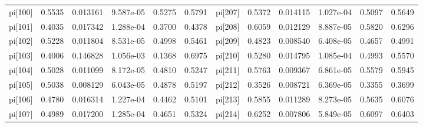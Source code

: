 \documentclass[12pt]{article}
\begin{document}
\begin{table}[h!]
\begin{tabular}{|llllll|llllll|}
pi[100] & 0.5535 & 0.013161  & 9.587e-05 & 0.5275 &0.5791 &pi[207] & 0.5372 & 0.014115  & 1.027e-04 & 0.5097 &0.5649 \\
pi[101] & 0.4035 & 0.017342  & 1.288e-04 & 0.3700 &0.4378 &pi[208] & 0.6059 & 0.012129  & 8.887e-05 & 0.5820 &0.6296 \\
pi[102] & 0.5228 & 0.011804  & 8.531e-05 & 0.4998 &0.5461 &pi[209] & 0.4823 & 0.008540  & 6.408e-05 & 0.4657 &0.4991 \\
pi[103] & 0.4006 & 0.146828  & 1.056e-03 & 0.1368 &0.6975 &pi[210] & 0.5280 & 0.014795  & 1.085e-04 & 0.4993 &0.5570 \\
pi[104] & 0.5028 & 0.011099  & 8.172e-05 & 0.4810 &0.5247 &pi[211] & 0.5763 & 0.009367  & 6.861e-05 & 0.5579 &0.5945 \\
pi[105] & 0.5038 & 0.008129  & 6.043e-05 & 0.4878 &0.5197 &pi[212] & 0.3526 & 0.008721  & 6.369e-05 & 0.3355 &0.3699 \\
pi[106] & 0.4780 & 0.016314  & 1.227e-04 & 0.4462 &0.5101 &pi[213] & 0.5855 & 0.011289  & 8.273e-05 & 0.5635 &0.6076 \\
pi[107] & 0.4989 & 0.017200  & 1.285e-04 & 0.4651 &0.5324 &pi[214] & 0.6252 & 0.007806  & 5.849e-05 & 0.6097 &0.6403 \\
\hline
\end{tabular}
\end{table}
\end{document}
